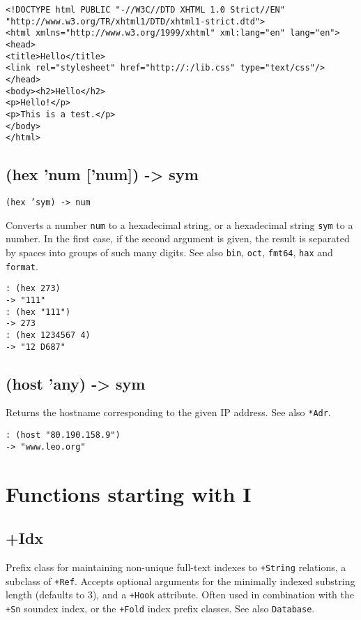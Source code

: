 {{{{{{\begin{verbatim}
<!DOCTYPE html PUBLIC "-//W3C//DTD XHTML 1.0 Strict//EN" "http://www.w3.org/TR/xhtml1/DTD/xhtml1-strict.dtd">
<html xmlns="http://www.w3.org/1999/xhtml" xml:lang="en" lang="en">
<head>
<title>Hello</title>
<link rel="stylesheet" href="http://:/lib.css" type="text/css"/>
</head>
<body><h2>Hello</h2>
<p>Hello!</p>
<p>This is a test.</p>
</body>
</html>
\end{verbatim}

 
\section{(hex 'num ['num]) -> sym}
\label{sec-8-1-8-11}


\texttt{(hex 'sym) -> num}

Converts a number \texttt{num} to a hexadecimal string, or a hexadecimal string
\texttt{sym} to a number. In the first case, if the second argument is given,
the result is separated by spaces into groups of such many digits. See
also \texttt{bin}, \texttt{oct}, \texttt{fmt64}, \texttt{hax} and \texttt{format}.


\begin{verbatim}
: (hex 273)
-> "111"
: (hex "111")
-> 273
: (hex 1234567 4)
-> "12 D687"
\end{verbatim}

 
\section{(host 'any) -> sym}
\label{sec-8-1-8-12}


Returns the hostname corresponding to the given IP address. See also
\texttt{*Adr}.


\begin{verbatim}
: (host "80.190.158.9")
-> "www.leo.org"
\end{verbatim}


\chapter{Functions starting with I}
\label{sec-8-1-9}


 
\section{+Idx}
\label{sec-8-1-9-1}


Prefix class for maintaining non-unique full-text indexes to \texttt{+String}
relations, a subclass of \texttt{+Ref}. Accepts optional arguments for the
minimally indexed substring length (defaults to 3), and a \texttt{+Hook}
attribute. Often used in combination with the \texttt{+Sn} soundex index, or
the \texttt{+Fold} index prefix classes. See also \texttt{Database}.


}}}}}}
